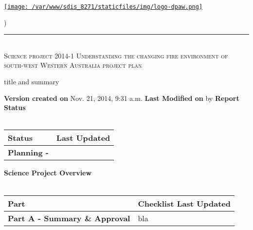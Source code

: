 \documentclass[version=last, paper=a4, DIV=18, usenames, dvipsnames]{scrartcl}
\newcommand{\HRule}{\rule{\linewidth}{0.1pt}}
\begin{document}
\setcounter{secnumdepth}{-1}


\begin{titlepage}
\begin{center}
\begin{minipage}[t]{0.28\textwidth}
\begin{flushleft}
\href{http://www.dpaw.wa.gov.au}{\texttt{[image: /var/www/sdis\_8271/staticfiles/img/logo-dpaw.png]}}
\end{flushleft}
\end{minipage}
\begin{minipage}[b]{0.7\textwidth}
\begin{flushright}
    \href{http://sdis.dpaw.wa.gov.au/documents/projectplan/1252/download/tex/}{}) \\
\end{flushright}
\end{minipage}
\HRule \\[0.4cm]
\vfill
\textsc{\Huge Science project 2014-1 Understanding the changing fire environment of south-west Western Australia \newline }
\vfill
\textsc{\Huge project plan}

\vfill\vfill\vfill\vfill
title and summary

\vfill\vfill\vfill\vfill\vfill\vfill\vfill\vfill

\textbf{Version created on} Nov. 21, 2014, 9:31 a.m.
\vfill
\textbf{Last Modified on}  by 
\vfill\vfill
\textbf{Report Status}\\\,
\begin{tabu} to \linewidth { | X[l] | X | }
\hline
{}
Status & Last Updated \\
\hline
\textbf{Planning - } \\
\hline
\end{tabu}
\vfill
\textbf{Science Project Overview}\\\,
\begin{tabu} to \linewidth { | X[l] | X | }
\hline
{}
Part & Checklist Last Updated \\
\hline
\textbf{Part A - Summary \& Approval} & bla \\
\hline
\end{tabu}

\end{center}
\end{titlepage}

\setcounter{tocdepth}{2}
\tableofcontents
\clearpage
\end{document}

